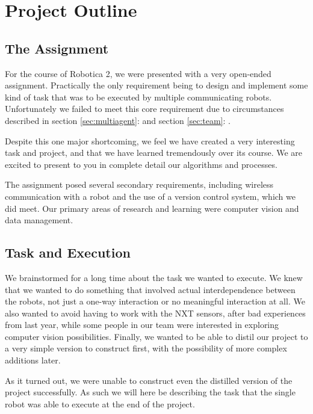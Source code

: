 \documentclass[10pt, abstracton, twocolumn]{scrartcl}
\newcommand{\sref}[1]{section \vref{#1}: \nameref{#1}}
\begin{document}
\clearpage

\thispagestyle{empty} %

\tableofcontents

\clearpage

\twocolumn

\section{Project Outline}

\subsection{The Assignment}
For the course of Robotica 2, we were presented with a very open-ended assignment. Practically the only requirement being to design and implement some kind of task that was to be executed by multiple communicating robots. Unfortunately we failed to meet this core requirement due to circumstances described in \sref{sec:multiagent} and \sref{sec:team}.

Despite this one major shortcoming, we feel we have created a very interesting task and project, and that we have learned tremendously over its course. We are excited to present to you in complete detail our algorithms and processes.

The assignment posed several secondary requirements, including wireless communication with a robot and the use of a version control system, which we did meet. Our primary areas of research and learning were computer vision and data management.

\subsection{Task and Execution}
We brainstormed for a long time about the task we wanted to execute. We knew that we wanted to do something that involved actual interdependence between the robots, not just a one-way interaction or no meaningful interaction at all. We also wanted to avoid having to work with the NXT sensors, after bad experiences from last year, while some people in our team were interested in exploring computer vision possibilities. Finally, we wanted to be able to distil our project to a very simple version to construct first, with the possibility of more complex additions later.

As it turned out, we were unable to construct even the distilled version of the project successfully. As such we will here be describing the task that the single robot was able to execute at the end of the project.
\end{document}
